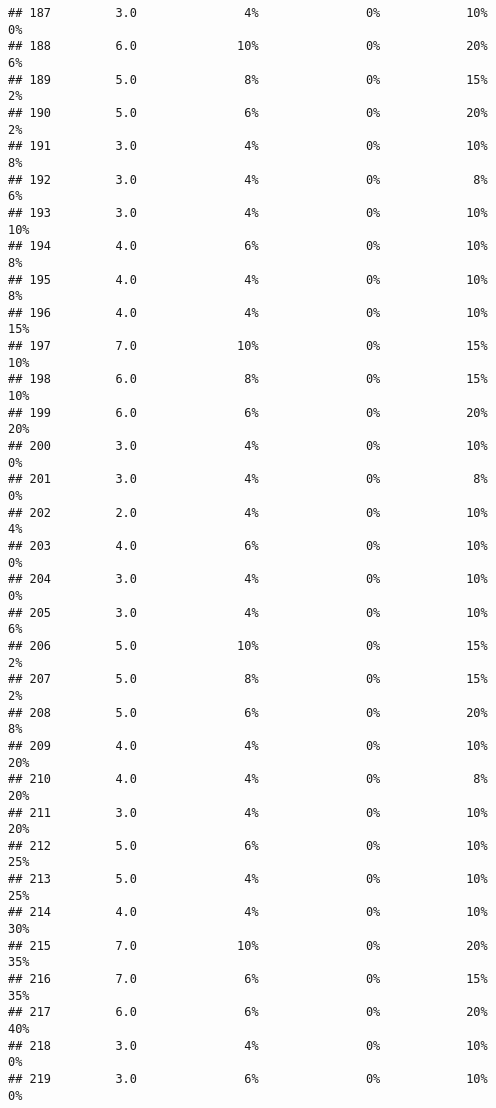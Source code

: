 \documentclass[
]{article}
\begin{document}
\begin{verbatim}
## 187         3.0               4%               0%            10%          0%
## 188         6.0              10%               0%            20%          6%
## 189         5.0               8%               0%            15%          2%
## 190         5.0               6%               0%            20%          2%
## 191         3.0               4%               0%            10%          8%
## 192         3.0               4%               0%             8%          6%
## 193         3.0               4%               0%            10%         10%
## 194         4.0               6%               0%            10%          8%
## 195         4.0               4%               0%            10%          8%
## 196         4.0               4%               0%            10%         15%
## 197         7.0              10%               0%            15%         10%
## 198         6.0               8%               0%            15%         10%
## 199         6.0               6%               0%            20%         20%
## 200         3.0               4%               0%            10%          0%
## 201         3.0               4%               0%             8%          0%
## 202         2.0               4%               0%            10%          4%
## 203         4.0               6%               0%            10%          0%
## 204         3.0               4%               0%            10%          0%
## 205         3.0               4%               0%            10%          6%
## 206         5.0              10%               0%            15%          2%
## 207         5.0               8%               0%            15%          2%
## 208         5.0               6%               0%            20%          8%
## 209         4.0               4%               0%            10%         20%
## 210         4.0               4%               0%             8%         20%
## 211         3.0               4%               0%            10%         20%
## 212         5.0               6%               0%            10%         25%
## 213         5.0               4%               0%            10%         25%
## 214         4.0               4%               0%            10%         30%
## 215         7.0              10%               0%            20%         35%
## 216         7.0               6%               0%            15%         35%
## 217         6.0               6%               0%            20%         40%
## 218         3.0               4%               0%            10%          0%
## 219         3.0               6%               0%            10%          0%

\end{verbatim}
\end{document}
